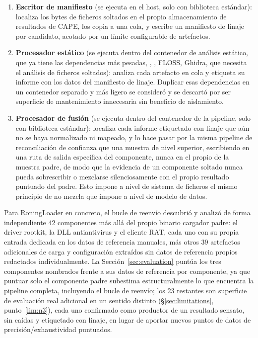 \begin{enumerate}
  \item \textbf{Escritor de manifiesto} (se ejecuta en el host, solo con
    biblioteca est\'andar): localiza los bytes de ficheros soltados en
    el propio almacenamiento de resultados de CAPE, los copia a una
    cola, y escribe un manifiesto de linaje por candidato, acotado por
    un l\'imite configurable de artefactos.
  \item \textbf{Procesador est\'atico} (se ejecuta dentro del contenedor
    de an\'alisis est\'atico, que ya tiene las dependencias m\'as
    pesadas, , , FLOSS, Ghidra, que
    necesita el an\'alisis de ficheros soltados): analiza cada artefacto
    en cola y etiqueta su informe con los datos del manifiesto de
    linaje. Duplicar esas dependencias en un contenedor separado y m\'as
    ligero se consider\'o y se descart\'o por ser superficie de
    mantenimiento innecesaria sin beneficio de aislamiento.
  \item \textbf{Procesador de fusi\'on} (se ejecuta dentro del
    contenedor de la pipeline, solo con biblioteca est\'andar):
    localiza cada informe etiquetado con linaje que a\'un no se haya
    normalizado ni mapeado, y lo hace pasar por la misma pipeline de
    reconciliaci\'on de confianza que una muestra de nivel superior,
    escribiendo en una ruta de salida espec\'ifica del componente,
    nunca en el propio  de la muestra padre,
    de modo que la evidencia de un componente soltado nunca pueda
    sobrescribir o mezclarse silenciosamente con el propio resultado
    puntuado del padre. Esto impone a nivel de sistema de ficheros el
    mismo principio de no mezcla que  impone a nivel
    de modelo de datos.
\end{enumerate}

Para RoningLoader en concreto, el bucle de reenv\'io descubri\'o y
analiz\'o de forma independiente 42 componentes m\'as all\'a del propio
binario cargador padre: el driver rootkit, la DLL antiantivirus y el
cliente RAT, cada uno con su propia entrada dedicada en los datos de
referencia manuales, m\'as otros 39 artefactos adicionales de carga y
configuraci\'on extra\'idos sin datos de referencia propios redactados
individualmente. La Secci\'on~\ref{sec:evaluation} punt\'ua los tres
componentes nombrados frente a sus datos de referencia por componente,
ya que puntuar solo el componente padre subestima estructuralmente lo
que encuentra la pipeline completa, incluyendo el bucle de reenv\'io;
los 23 restantes son superficie de evaluaci\'on real adicional en un
sentido distinto (\S\ref{sec:limitations}, punto~\ref{lim:n3}), cada uno
confirmado como productor de un resultado sensato, sin ca\'idas y
etiquetado con linaje, en lugar de aportar nuevos puntos de datos de
precisi\'on/exhaustividad puntuados.

